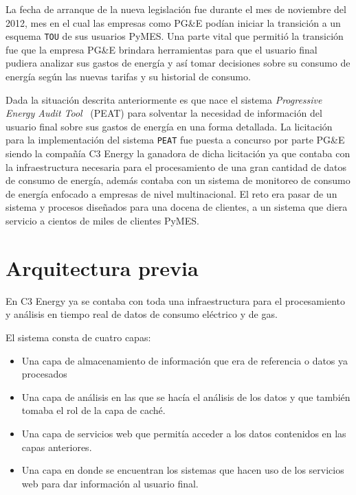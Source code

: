 La fecha de arranque de la nueva legislación fue durante el mes de noviembre
del 2012, mes en el cual las empresas como PG\&E podían iniciar la transición
a un esquema \texttt{TOU} de sus usuarios PyMES.
Una parte vital que permitió la transición fue que la empresa PG\&E brindara
herramientas para que el usuario final pudiera analizar sus gastos de energía
y así tomar decisiones sobre su consumo de energía según las nuevas tarifas
y su historial de consumo.

Dada la situación descrita anteriormente es que nace el sistema
\textit{Progressive Energy Audit Tool} \ (PEAT) para solventar la necesidad
de información del usuario final sobre sus gastos de energía en una forma detallada.
La licitación para la implementación del sistema \texttt{PEAT} fue puesta
a concurso por parte PG\&E siendo la compañía C3 Energy la ganadora de dicha
licitación  ya que contaba con la infraestructura necesaria para el
procesamiento de una gran cantidad de datos de consumo de energía,
además contaba con un sistema de monitoreo de consumo de energía enfocado
a empresas de nivel multinacional. El reto era pasar de un sistema y procesos
diseñados para una docena de clientes, a un sistema que diera servicio a
cientos de miles de clientes PyMES.

\section{Arquitectura previa}
En C3 Energy ya se contaba con toda una infraestructura para el
procesamiento y análisis en tiempo real de datos de consumo eléctrico
y de gas.

\vspace{2.5mm}

El sistema consta de cuatro capas:

\begin{itemize}
\item Una capa de almacenamiento de información que era de referencia
  o datos ya procesados
\item Una capa de análisis en las que se hacía el análisis de los datos
  y que también tomaba el rol de la capa de caché.
\item Una capa de servicios web que permitía acceder a los datos contenidos
  en las capas anteriores.
\item Una capa en donde se encuentran los sistemas que hacen uso de los
  servicios web para dar información al usuario final.
\end{itemize}

